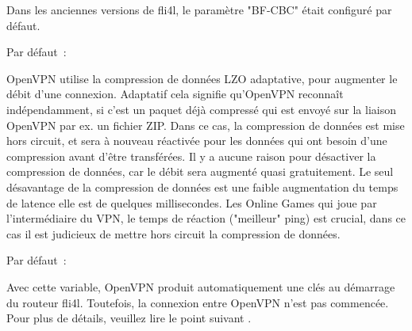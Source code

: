 \begin{description}

  Dans les anciennes versions de fli4l, le paramètre "BF-CBC" était configuré par défaut.


  Par défaut~: 

  OpenVPN utilise la compression de données LZO adaptative, pour augmenter le
  débit d'une connexion. Adaptatif cela signifie qu'OpenVPN reconnaît indépendamment,
  si c'est un paquet déjà compressé qui est envoyé sur la liaison OpenVPN par ex.
  un fichier ZIP. Dans ce cas, la compression de données est mise hors circuit, et
  sera à nouveau réactivée pour les données qui ont besoin d'une compression avant
  d'être transférées. Il y a aucune raison pour désactiver la compression de données,
  car le débit sera augmenté quasi gratuitement. Le seul désavantage de la compression
  de données est une faible augmentation du temps de latence elle est de quelques
  millisecondes. Les Online Games qui joue par l'intermédiaire du VPN, le temps de
  réaction ("meilleur" ping) est crucial, dans ce cas il est judicieux de mettre
  hors circuit la compression de données.


  Par défaut~: 

  Avec cette variable, OpenVPN produit automatiquement une clés au démarrage
  du routeur fli4l. Toutefois, la connexion entre OpenVPN n'est pas
  commencée. Pour plus de détails, veuillez lire le point suivant
  .



\end{description}
